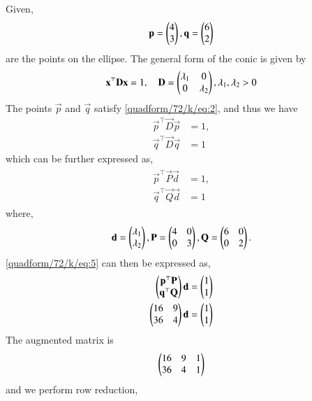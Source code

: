 Given, 
\begin{align}
\mathbf{p} = \begin{pmatrix}4\\3\end{pmatrix} , \mathbf{q} = \begin{pmatrix} 6\\2\end{pmatrix}
\end{align}
are the points on the ellipse.
The general form of the conic is given by
\begin{align}
\label{quadform/72/k/eq:2}
\mathbf{x}^{\top}\mathbf{D}\mathbf{x} = 1, \quad \mathbf{D} = \begin{pmatrix}\lambda_1 & 0 \\ 0 & \lambda_2\end{pmatrix}, \lambda_1,\lambda_2 > 0
\end{align}
The points $\vec{p}$ and $\vec{q}$ satisfy \eqref{quadform/72/k/eq:2}, and thus we have
\begin{align}
\label{quadform/72/k/eq:ellipse_std_ab}
\vec{p}^{\top}\vec{D}\vec{p} &= 1,
\\
\vec{q}^{\top}\vec{D}\vec{q} &= 1
\end{align}
which can be further expressed as,
\begin{align}
\label{quadform/72/k/eq:5}
\begin{split}
\vec{p}^{\top}\vec{P}\vec{d} &= 1,
\\
\vec{q}^{\top}\vec{Q}\vec{d} &= 1
\end{split}
\end{align}
where,
\begin{align}
\mathbf{d} = \begin{pmatrix}\lambda_1\\ \lambda_2\end{pmatrix},
\mathbf{P} = \begin{pmatrix}4 & 0 \\ 0 & 3\end{pmatrix},
\mathbf{Q} = \begin{pmatrix}6 & 0 \\ 0 & 2\end{pmatrix}.
\end{align}
\eqref{quadform/72/k/eq:5} can then be expressed as,
\begin{align}
\begin{pmatrix}\mathbf{p}^{\top}\mathbf{P}\\ \mathbf{q}^{\top}\mathbf{Q}\end{pmatrix}\mathbf{d} &= \begin{pmatrix}1\\1\end{pmatrix}\\
\begin{pmatrix}16 & 9\\ 36 & 4\end{pmatrix}\mathbf{d} &= \begin{pmatrix}1\\1\end{pmatrix}\label{quadform/72/k/eq:8}
\end{align}
The augmented matrix is 
\begin{align}
\begin{pmatrix}16 & 9 & 1 \\ 36 & 4 & 1 \end{pmatrix}
\end{align}
and we perform row reduction,
